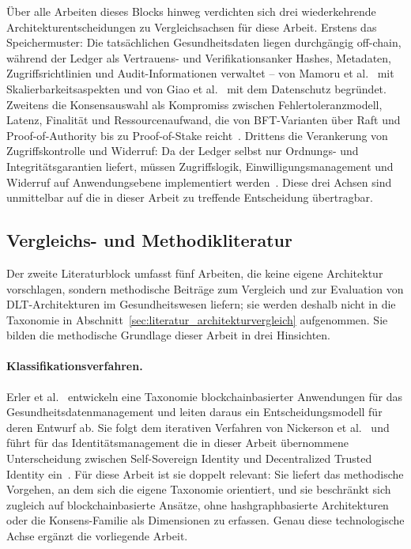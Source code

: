 Über alle Arbeiten dieses Blocks hinweg verdichten sich drei wiederkehrende Architekturentscheidungen zu Vergleichsachsen für diese Arbeit. Erstens das Speichermuster: Die tatsächlichen Gesundheitsdaten liegen durchgängig off-chain, während der Ledger als Vertrauens- und Verifikationsanker Hashes, Metadaten, Zugriffsrichtlinien und Audit-Informationen verwaltet -- von Mamoru et al.~\cite{mamoru2026} mit Skalierbarkeitsaspekten und von Giao et al.~\cite{giao2026} mit dem Datenschutz begründet. Zweitens die Konsensauswahl als Kompromiss zwischen Fehlertoleranzmodell, Latenz, Finalität und Ressourcenaufwand, die von BFT-Varianten über Raft und Proof-of-Authority bis zu Proof-of-Stake reicht~\cite{joshimahajan2025, farin2025, amanat2022, tawfik2025}. Drittens die Verankerung von Zugriffskontrolle und Widerruf: Da der Ledger selbst nur Ordnungs- und Integritätsgarantien liefert, müssen Zugriffslogik, Einwilligungsmanagement und Widerruf auf Anwendungsebene implementiert werden~\cite{mamoru2026, tawfik2025, guptaverma2026}. Diese drei Achsen sind unmittelbar auf die in dieser Arbeit zu treffende Entscheidung übertragbar.


\subsection{Vergleichs- und Methodikliteratur}
\label{sec:literatur_vergleichsmethodik}

Der zweite Literaturblock umfasst fünf Arbeiten, die keine eigene Architektur vorschlagen, sondern methodische Beiträge zum Vergleich und zur Evaluation von DLT-Architekturen im Gesundheitswesen liefern; sie werden deshalb nicht in die Taxonomie in Abschnitt~\ref{sec:literatur_architekturvergleich} aufgenommen. Sie bilden die methodische Grundlage dieser Arbeit in drei Hinsichten.

\paragraph{Klassifikationsverfahren.} Erler et al.~\cite{erler2024} entwickeln eine Taxonomie blockchainbasierter Anwendungen für das Gesundheitsdatenmanagement und leiten daraus ein Entscheidungsmodell für deren Entwurf ab. Sie folgt dem iterativen Verfahren von Nickerson et al.~\cite{nickerson2013} und führt für das Identitätsmanagement die in dieser Arbeit übernommene Unterscheidung zwischen Self-Sovereign Identity und Decentralized Trusted Identity ein~\cite{erler2024}. Für diese Arbeit ist sie doppelt relevant: Sie liefert das methodische Vorgehen, an dem sich die eigene Taxonomie orientiert, und sie beschränkt sich zugleich auf blockchainbasierte Ansätze, ohne hashgraphbasierte Architekturen oder die Konsens-Familie als Dimensionen zu erfassen. Genau diese technologische Achse ergänzt die vorliegende Arbeit.

